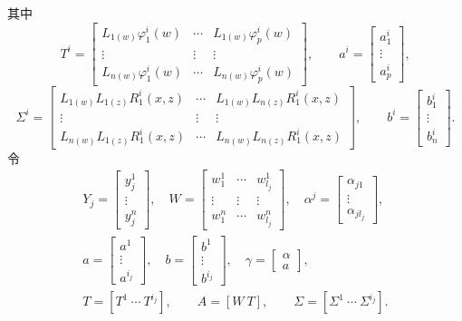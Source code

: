其中
\[
T^i=
\begin{bmatrix}
L_{1(w)}\varphi_1^i(w)&\cdots&L_{1(w)}\varphi_p^i(w)\\
\vdots&\vdots&\vdots\\
L_{n(w)}\varphi_1^i(w)&\cdots&L_{n(w)}\varphi_p^i(w)
\end{bmatrix},
\qquad
a^i=\begin{bmatrix}a_1^i\\\vdots\\a_p^i\end{bmatrix},
\]
\[
\Sigma^i=
\begin{bmatrix}
L_{1(w)}L_{1(z)}R_1^i(x,z)&\cdots&L_{1(w)}L_{n(z)}R_1^i(x,z)\\
\vdots&\vdots&\vdots\\
L_{n(w)}L_{1(z)}R_1^i(x,z)&\cdots&L_{n(w)}L_{n(z)}R_1^i(x,z)
\end{bmatrix},
\qquad
b^i=\begin{bmatrix}b_1^i\\\vdots\\b_n^i\end{bmatrix}.
\]
令
\[
\begin{gathered}
Y_j=\begin{bmatrix}y_j^1\\\vdots\\y_j^n\end{bmatrix},
\quad
W=\begin{bmatrix}w_1^1&\cdots&w_{l_j}^1\\
\vdots&\vdots&\vdots\\w_1^n&\cdots&w_{l_j}^n\end{bmatrix},
\quad
\alpha^j=\begin{bmatrix}\alpha_{j1}\\\vdots\\\alpha_{jl_j}\end{bmatrix},\\
a=\begin{bmatrix}a^1\\\vdots\\a^{i_j}\end{bmatrix},
\quad b=\begin{bmatrix}b^1\\\vdots\\b^{i_j}\end{bmatrix},
\quad\gamma=\begin{bmatrix}\alpha\\a\end{bmatrix},\\
T=[T^1\ \cdots\ T^{i_j}],\qquad A=[W\ T],
\qquad\Sigma=[\Sigma^1\ \cdots\ \Sigma^{i_j}].
\end{gathered}
\]
